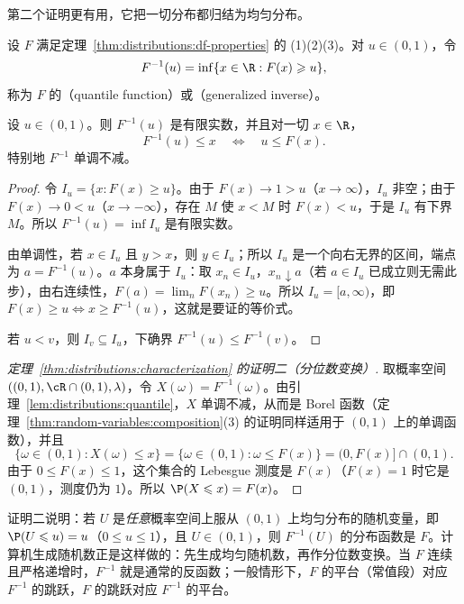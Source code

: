 第二个证明更有用，它把一切分布都归结为均匀分布。

\begin{definition}[分位数函数]\label{def:distributions:quantile}
设 $F$ 满足定理~\ref{thm:distributions:df-properties} 的 (1)(2)(3)。对 $u\in(0,1)$，令
\[
F^{-1}(u)=\inf\{x\in\R: F(x)\geqslant u\},
\]
称为 $F$ 的（quantile function）或（generalized inverse）。
\end{definition}

\begin{lemma}\label{lem:distributions:quantile}
设 $u\in(0,1)$。则 $F^{-1}(u)$ 是有限实数，并且对一切 $x\in\R$，
\[
F^{-1}(u)\leqslant x\quad\Longleftrightarrow\quad u\leqslant F(x).
\]
特别地 $F^{-1}$ 单调不减。
\end{lemma}
\begin{proof}
令 $I_u=\{x:F(x)\geqslant u\}$。由于 $F(x)\to1>u$（$x\to\infty$），$I_u$ 非空；由于 $F(x)\to0<u$（$x\to-\infty$），存在 $M$ 使 $x<M$ 时 $F(x)<u$，于是 $I_u$ 有下界 $M$。所以 $F^{-1}(u)=\inf I_u$ 是有限实数。

由单调性，若 $x\in I_u$ 且 $y>x$，则 $y\in I_u$；所以 $I_u$ 是一个向右无界的区间，端点为 $a=F^{-1}(u)$。$a$ 本身属于 $I_u$：取 $x_n\in I_u$，$x_n\downarrow a$（若 $a\in I_u$ 已成立则无需此步），由右连续性，$F(a)=\lim_nF(x_n)\geqslant u$。所以 $I_u=[a,\infty)$，即 $F(x)\geqslant u\iff x\geqslant F^{-1}(u)$，这就是要证的等价式。

若 $u<v$，则 $I_v\subseteq I_u$，下确界 $F^{-1}(u)\leqslant F^{-1}(v)$。
\end{proof}

\begin{proof}[定理~\ref{thm:distributions:characterization} 的证明二（分位数变换）]
取概率空间 $((0,1),\cR\cap(0,1),\lambda)$，令 $X(\omega)=F^{-1}(\omega)$。由引理~\ref{lem:distributions:quantile}，$X$ 单调不减，从而是 Borel 函数（定理~\ref{thm:random-variables:composition}(3) 的证明同样适用于 $(0,1)$ 上的单调函数），并且
\[
\{\omega\in(0,1): X(\omega)\leqslant x\}=\{\omega\in(0,1):\omega\leqslant F(x)\}=(0,F(x)]\cap(0,1).
\]
由于 $0\leqslant F(x)\leqslant1$，这个集合的 Lebesgue 测度是 $F(x)$（$F(x)=1$ 时它是 $(0,1)$，测度仍为 $1$）。所以 $\P(X\leqslant x)=F(x)$。
\end{proof}

\begin{remark}[分位数变换]
证明二说明：若 $U$ 是\emph{任意}概率空间上服从 $(0,1)$ 上均匀分布的随机变量，即 $\P(U\leqslant u)=u$（$0\leqslant u\leqslant1$），且 $U\in(0,1)$，则 $F^{-1}(U)$ 的分布函数是 $F$。计算机生成随机数正是这样做的：先生成均匀随机数，再作分位数变换。当 $F$ 连续且严格递增时，$F^{-1}$ 就是通常的反函数；一般情形下，$F$ 的平台（常值段）对应 $F^{-1}$ 的跳跃，$F$ 的跳跃对应 $F^{-1}$ 的平台。
\end{remark}

